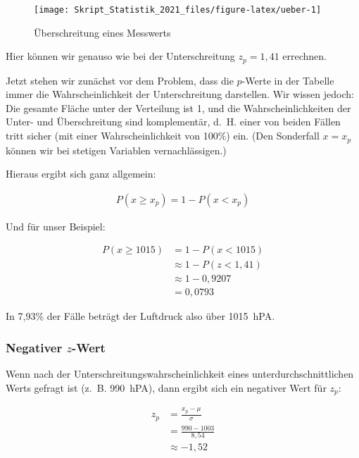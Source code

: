 \documentclass[
  11pt,
  ngerman,
  a4paper,
]{report}
\begin{document}
\begin{figure}[!h]

{\centering \texttt{[image: Skript\_Statistik\_2021\_files/figure-latex/ueber-1]} 

}

\caption{Überschreitung eines Messwerts}\label{fig:ueber}
\end{figure}

Hier können wir genauso wie bei der Unterschreitung \(z_p=1{,}41\) errechnen.

Jetzt stehen wir zunächst vor dem Problem, dass die \(p\)-Werte in der Tabelle immer die Wahrscheinlichkeit der Unterschreitung darstellen. Wir wissen jedoch: Die gesamte Fläche unter der Verteilung ist 1, und die Wahrscheinlichkeiten der Unter- und Überschreitung sind komplementär, d.~H. einer von beiden Fällen tritt sicher (mit einer Wahrscheinlichkeit von 100\%) ein. (Den Sonderfall \(x=x_p\) können wir bei stetigen Variablen vernachlässigen.)

Hieraus ergibt sich ganz allgemein:

\[
  \begin{aligned}
    P(x \geq x_p) = 1-P(x<x_p)
  \end{aligned}
  \label{eq:ueber}
\]

Und für unser Beispiel:

\[
  \begin{aligned}
    P(x \geq 1015) &= 1-P(x < 1015) \\
    &\approx1-P(z < 1,41)\\
    &\approx1-0{,}9207\\
    &= 0{,}0793
  \end{aligned}
\]

In 7,93\% der Fälle beträgt der Luftdruck also über 1015~hPA.

\hypertarget{negativer-z-wert}{%
\subsubsection{\texorpdfstring{Negativer \(z\)-Wert}{Negativer z-Wert}}\label{negativer-z-wert}}

Wenn nach der Unterschreitungswahrscheinlichkeit eines unterdurchschnittlichen Werts gefragt ist (z.~B. 990~hPA), dann ergibt sich ein negativer Wert für \(z_p\):

\begin{equation}
  \begin{aligned}
    z_p &= \frac{x_p-\mu}{\sigma} \\[4pt]
        &= \frac{990-1003}{8{,}54} \\[4pt]
        &\approx -1{,}52
  \end{aligned}
\end{equation}
\end{document}
